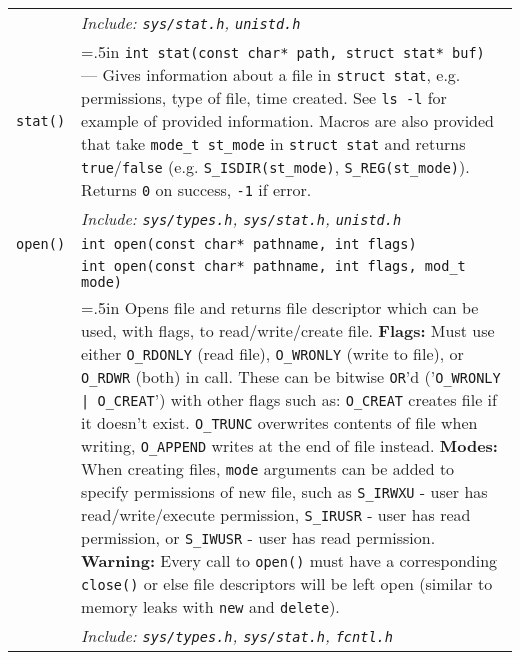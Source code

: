 \documentclass{article}
\newcommand{\indenth}[1][.5]{\hangindent=#1in
                         \hangafter=1 }
\begin{document}
\begin{longtabu}{|p{.9in}|p{6.3in}<{\strut}|}
    & \hspace{.5in}\it Include: \rm\texttt{sys/stat.h}, \texttt{unistd.h}
        \\ 
    \texttt{stat()} & \indenth\texttt{int stat(const char* path,  struct stat* buf)} --- Gives information about a file in \texttt{struct stat}, e.g. permissions, type of file, time created. See \texttt{ls -l} for example of provided information. Macros are also provided that take \texttt{mode\_t st\_mode} in \texttt{struct stat} and returns \texttt{true}/\texttt{false} (e.g. \texttt{S\_ISDIR(st\_mode)}, \texttt{S\_REG(st\_mode)}). Returns \texttt{0} on success, \texttt{-1} if error.
        \\
    & \hspace{.5in}\it Include: \rm\texttt{sys/types.h}, \texttt{sys/stat.h}, \texttt{unistd.h}
        \\ \hline
    \texttt{open()} & \texttt{int open(const char* pathname, int flags)}
        \\
    & \texttt{int open(const char* pathname, int flags, mod\_t mode)}
        \\
    & \indenth\hspace{.5in}Opens file and returns file descriptor which can be used, with flags, to read/write/create file. 
    \newline\textbf{Flags:} Must use either \texttt{O\_RDONLY} (read file), \texttt{O\_WRONLY} (write to file), or \texttt{O\_RDWR} (both) in call. These can be bitwise \texttt{OR}'d ('\texttt{O\_WRONLY | O\_CREAT}') with other flags such as:  \texttt{O\_CREAT} creates file if it doesn't exist. \texttt{O\_TRUNC} overwrites contents of file when writing, \texttt{O\_APPEND} writes at the end of file instead. 
    \newline\textbf{Modes:} When creating files, \texttt{mode} arguments can be added to specify permissions of new file, such as \texttt{S\_IRWXU} - user has read/write/execute permission, \texttt{S\_IRUSR} - user has read permission, or \texttt{S\_IWUSR} - user has read permission.
    \newline\textbf{Warning:} Every call to \texttt{open()} must have a corresponding \texttt{close()} or else file descriptors will be left open (similar to memory leaks with \texttt{new} and \texttt{delete}).
        \\
    & \hspace{.5in}\it Include: \rm\texttt{sys/types.h}, \texttt{sys/stat.h}, \texttt{fcntl.h}
        \\

\end{longtabu}
\end{document}
